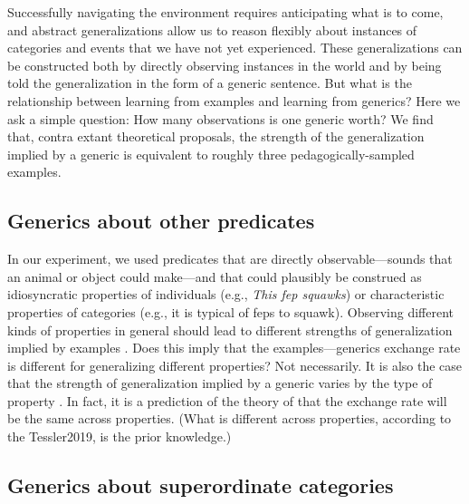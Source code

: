 \documentclass[10pt,letterpaper]{article}
\begin{document}
Successfully navigating the environment requires anticipating what is to come, and abstract generalizations allow us to reason flexibly about instances of categories and events that we have not yet experienced. 
These generalizations can be constructed both by directly observing instances in the world and by being told the generalization in the form of a generic sentence. 
But what is the relationship between learning from examples and learning from generics? 
Here we ask a simple question: How many observations is one generic worth?
We find that, contra extant theoretical proposals, the strength of the generalization implied by a generic is equivalent to roughly three pedagogically-sampled examples. 

\subsection{Generics about other predicates}

In our experiment, we used predicates that are directly observable---sounds that an animal or object could make---and that could plausibly be construed as idiosyncratic properties of individuals (e.g., \emph{This fep squawks}) or characteristic properties of categories (e.g., it is typical of feps to squawk).
Observing different kinds of properties in general should lead to different strengths of generalization implied by examples \cite{Nisbett1983}. 
Does this imply that the examples---generics exchange rate is different for generalizing different properties?
Not necessarily.
It is also the case that the strength of generalization implied by a generic varies by the type of property \cite{Tessler2020}. 
In fact, it is a prediction of the theory of  that the exchange rate will be the same across properties. (What is different across properties, according to the Tessler2019, is the prior knowledge.)

\subsection{Generics about superordinate categories}
\end{document}
